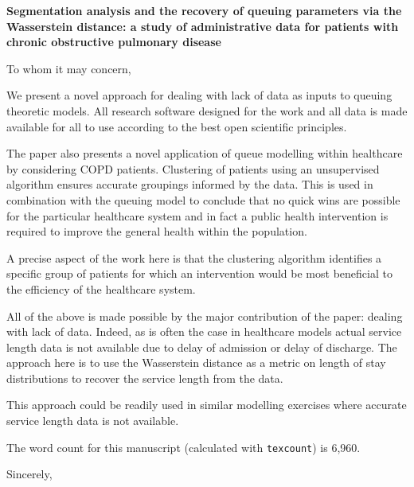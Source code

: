 \documentclass[11pt]{letter}
\begin{document}
\signature{The authors}

\begin{letter}{}

\textbf{
  Segmentation analysis and the recovery of queuing parameters via the
  Wasserstein distance: a study of administrative data for patients with chronic
  obstructive pulmonary disease
}

To whom it may concern,

We present a novel approach for dealing with lack of data as inputs to queuing
theoretic models. All research software designed for the work
and all data is made available for all to use according to the best open
scientific principles.

The paper also presents a novel application of queue modelling within healthcare
by considering COPD patients. Clustering of patients using an unsupervised
algorithm ensures accurate groupings informed by the data. This is used in
combination with the queuing model to conclude that no quick wins are possible
for the particular healthcare system and in fact a public health
intervention is required to improve the general health within the population.

A precise aspect of the work here is that the clustering algorithm identifies a
specific group of patients for which an intervention would be most
beneficial to the efficiency of the healthcare system.

All of the above is made possible by the major contribution of the paper:
dealing with lack of data. Indeed, as is often the case in healthcare models
actual service length data is not available due to delay of admission or
delay of discharge. The approach here is to use the Wasserstein distance as a
metric on length of stay distributions to recover the service length from
the data.

This approach could be readily used in similar modelling exercises
where accurate service length data is not available.

The word count for this manuscript (calculated with \texttt{texcount}) is 6,960.

\closing{Sincerely,}

\end{letter}
\end{document}
